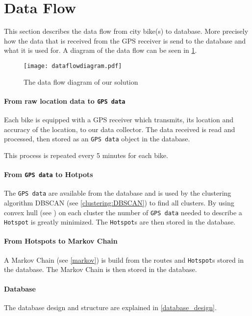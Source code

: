 \section{Data Flow}
This section describes the data flow from city bike(s) to database. More precisely how the data that is received from the GPS receiver is send to the database and what it is used for.
A diagram of the data flow can be seen in \cref{fig:dataFlowDiagram}.

\begin{figure}[H]
\texttt{[image: dataflowdiagram.pdf]}
\caption{The data flow diagram of our solution}
\label{fig:dataFlowDiagram}
\end{figure}

\paragraph{From raw location data to \texttt{GPS data}}
Each bike is equipped with a GPS receiver which transmits, its location and accuracy of the location, to our data collector.
The data received is read and processed, then stored as an \texttt{GPS data} object in the database.

This process is repeated every 5 minutes for each bike.

\paragraph{From \texttt{GPS data} to Hotpots}
The \texttt{GPS data} are available from the database and is used by the clustering algorithm DBSCAN (see \cref{clustering:DBSCAN}) to find all clusters.
By using convex hull (see \cite[page 1031]{aadbook}) on each cluster the number of \texttt{GPS data} needed to describe a \texttt{Hotspot} is greatly minimized.
The \texttt{Hotspot}s are then stored in the database.

\paragraph{From Hotspots to Markov Chain}
A Markov Chain (see \cref{markov}) is build from the routes and \texttt{Hotspot}s stored in the database.
The Markov Chain is then stored in the database.

\paragraph{Database}
The database design and structure are explained in \cref{database_design}.
